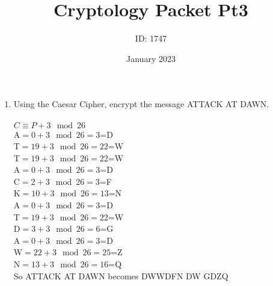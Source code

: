 \documentclass[]{article}
\date{January 2023}
\author{ID: 1747}
\title{Cryptology Packet Pt3}
\begin{document}
\maketitle

\begin{enumerate}
    \item Using the Caesar Cipher, encrypt the message ATTACK AT DAWN.
    \\\\$C \equiv P + 3 \mod 26$
    \\A$=0 + 3 \mod 26 = 3$=D
    \\T$=19 + 3 \mod 26 = 22$=W
    \\T$=19 + 3 \mod 26 = 22$=W
    \\A$=0 + 3 \mod 26 = 3$=D
    \\C$=2 + 3 \mod 26 = 3$=F
    \\K$=10 + 3 \mod 26 = 13$=N
    \\A$=0 + 3 \mod 26 = 3$=D
    \\T$=19 + 3 \mod 26 = 22$=W
    \\D$=3 + 3 \mod 26 = 6$=G
    \\A$=0 + 3 \mod 26 = 3$=D
    \\W$=22 + 3 \mod 26 = 25$=Z
    \\N$=13 + 3 \mod 26 = 16$=Q
    \\So ATTACK AT DAWN becomes DWWDFN DW GDZQ


\end{enumerate}
\end{document}
